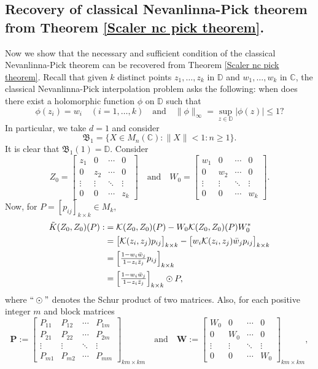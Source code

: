\documentclass[12pt]{amsart}%
\numberwithin{equation}{section}
\newcommand{\fB}{{\mathfrak{B}}}
\newcommand{\clk}{\mathcal{K}}
\newcommand{\D}{\mathbb{D}}
\newcommand{\C}{\mathbb{C}}
\begin{document}
\subsection{Recovery of classical Nevanlinna-Pick theorem from Theorem \ref{Scaler nc pick theorem}.}\label{subsection_recovery NP theorem}
Now we show that the necessary and sufficient condition of the classical Nevanlinna-Pick theorem can be recovered from Theorem \ref{Scaler nc pick theorem}. Recall that given $k$ distinct points $z_1, \ldots, z_k$ in $\D$ and $w_1, \ldots, w_k$ in $\C$, the classical Nevanlinna-Pick interpolation problem asks the following: when does there exist a holomorphic function $\phi$ on $\D$ such that 
\[\phi(z_i)=w_i\quad (i=1,\ldots, k) \quad\text{and}\quad \|\phi\|_{\infty}=\sup_{z\in \D}|\phi(z)|\leq 1?\]
In particular, we take $d=1$ and consider
\[\fB_1=\{X\in M_n(\C): \|X\|<1: n\geq 1 \}.\]
It is clear that $\fB_1(1)=\D$. Consider
\[
Z_0=\begin{bmatrix}
z_1 & 0 & \cdots & 0 \\
0 & z_2 & \cdots & 0 \\
\vdots & \vdots & \ddots & \vdots \\
0 & 0 & \cdots & z_k
\end{bmatrix} \quad \text{and}\quad W_0=\begin{bmatrix}
w_1 & 0 & \cdots & 0 \\
0 & w_2 & \cdots & 0 \\
\vdots & \vdots & \ddots & \vdots \\
0 & 0 & \cdots & w_k
\end{bmatrix}.
\]
Now, for $P=[p_{ij}]_{k\times k}\in M_k$,
\allowdisplaybreaks
\begingroup
\begin{align*}
\Tilde{K}(Z_0, Z_0)(P):&=\clk(Z_0, Z_0)(P)-W_0 \clk(Z_0, Z_0)(P) W_0^*\\
&=\big[\clk(z_i ,z_j) p_{ij}\big]_{k\times k}- \big[w_i\clk(z_i ,z_j)\Bar{w}_j p_{ij}\big]_{k\times k}\\
&=\begin{bmatrix}\frac{1-w_i\Bar{w}_j}{1-z_i\Bar{z}_j}p_{ij}\end{bmatrix}_{k\times k}\\
&=\begin{bmatrix}\frac{1-w_i\Bar{w}_j}{1-z_i\Bar{z}_j}\end{bmatrix}_{k\times k} \odot P,
\end{align*}
\endgroup
where $``\odot"$ denotes the Schur product of two matrices.
Also, for each positive integer $m$ and block matrices 
\[
\mathbf{P}:=\begin{bmatrix}
P_{11} & P_{12} & \cdots & P_{1m} \\
P_{21} & P_{22} & \cdots & P_{2m}\\
\vdots & \vdots & \ddots & \vdots \\
P_{m1} & P_{m2} & \cdots & P_{mm}
\end{bmatrix}_{km\times km} \quad \text{and}\quad \mathbf{W}:=\begin{bmatrix}
W_0 & 0 & \cdots & 0 \\
0 & W_0 & \cdots & 0 \\
\vdots & \vdots & \ddots & \vdots \\
0 & 0 & \cdots & W_0
\end{bmatrix}_{km\times km},
\]
\end{document}
